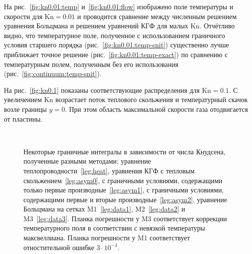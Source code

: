 \documentclass[
aps,%
12pt,%
final,%
notitlepage,%
oneside,%
onecolumn,%
nobibnotes,%
nofootinbib,%
superscriptaddress,%
noshowpacs,%
showkeys,%
floatfix,%
tightenlines,%
centertags]%
{revtex4}
\newcommand{\Kn}{\mathrm{Kn}}
\begin{document}
На рис.~\ref{fig:kn0.01:temp} и~\ref{fig:kn0.01:flow} изображено поле температуры и скорости
для \(\Kn=0.01\) и проводится сравнение между численным решением уравнения Больцмана
и решением уравнений КГФ для малых \(\Kn\).
Отчётливо видно, что температурное поле, полученное с использованием
граничного условия старшего порядка (рис.~\ref{fig:kn0.01:temp-snit})
существенно лучше приближает точное решение (рис.~\ref{fig:kn0.01:temp-exact})
по сравнению с температурным полем, полученным без его использования (рис.~\ref{fig:continuum:temp-snit}).

На рис.~\ref{fig:kn0.1} показаны соответствующие распределения для \(\Kn=0.1\).
С увеличением \(\Kn\) возрастает поток теплового скольжения и температурный скачок возле границы \(y=0\).
При этом область максимальной скорости газа отодвигается от пластины.

\begin{figure}
    \centering
    \\
    \caption{
        Некоторые граничные интегралы в зависимости от числа Кнудсена, полученные разными методами:
        уравнение теплопроводности~\ref{leg:heat},
        уравнения КГФ с тепловым скольжением~\ref{leg:asym0},
        с граничными условиями, содержащими только первые производные~\ref{leg:asym1},
        с граничными условиями, содержащими первые и вторые производные~\ref{leg:asym2},
        уравнение Больцмана на сетках M1~\ref{leg:data1}, M2~\ref{leg:data2} и M3~\ref{leg:data3}.
        Планка погрешности у M3 соответствует коррекции температурного поля в соответствии
        с невязкой температуры максвеллиана.
        Планка погрешности у M1 соответствует отностительной ошибке \(3\cdot10^{-4}\).
    }
    \label{fig:comparison}
\end{figure}
\end{document}
